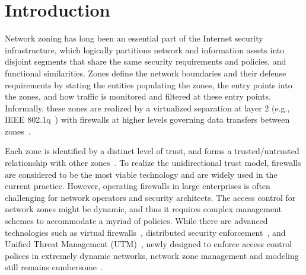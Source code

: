 \chapter{Introduction}
\label{intro}

Network zoning has long been an essential part of the Internet security infrastructure,
which logically partitions network and information assets into disjoint segments that share the
same security requirements and policies, and functional similarities. Zones define the network boundaries
and their defense
requirements by stating the entities populating the zones, the entry points into the zones, and
how traffic is monitored and filtered at these entry points. Informally, these zones
are realized by a virtualized separation at layer 2 (e.g., IEEE 802.1q~\cite{ieee2018vlan})
with firewalls at higher levels governing data transfers between zones~\cite{mayer2000fang}.

Each zone is identified by a distinct level of trust, and
forms a trusted/untrusted relationship with other zones~\cite{obregon2015infrastructure}.
To realize the unidirectional trust model, firewalls are considered to be the most viable
technology and are widely used in the current practice. However, operating firewalls in
large enterprises is often challenging for network operators and security architects. The
access control for network zones might be dynamic, and thus it requires complex
management schemes to accommodate a myriad of policies. While there are advanced
technologies such as virtual firewalls~\cite{deng2015vnguard,bakker2016network}, distributed
security enforcement~\cite{markham2001security,yu2017psi}, and Unified
Threat Management (UTM)~\cite{qi2007towards}, newly designed to enforce access control polices in extremely
dynamic networks, network zone management and modeling
still remains cumbersome~\cite{ramasamy2011towards,gontarczyk2015blueprint}.


